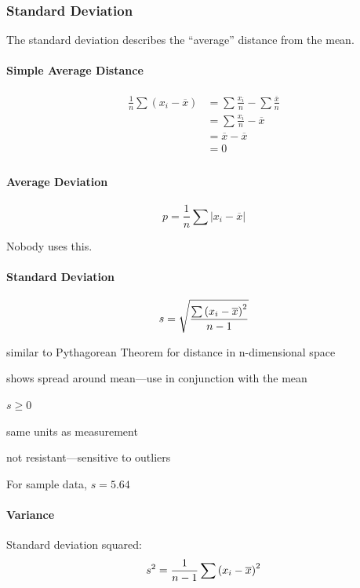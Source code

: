 \documentclass{exam}
\newcommand*\mean[1]{\overline{#1}}
\begin{document}
  \subsubsection{Standard Deviation}

  The standard deviation describes the ``average'' distance from the mean.

  \paragraph{Simple Average Distance}
  \begin{align*}
    \frac{1}{n} \sum (x_i - \mean{x}) & = \sum \frac{x_i}{n} - \sum \frac{ \mean{x} }{n} \\
                                      & = \sum \frac{x_i}{n} - \mean{x} \\
                                      & = \mean{x} - \mean{x} \\
                                      & = 0 \\
  \end{align*}

  \paragraph{Average Deviation}
  \[
    p = \frac{1}{n} \sum |x_i - \mean{x}|
  \]

  Nobody uses this.

  \paragraph{Standard Deviation}
  \[
    s = \sqrt{ \frac{\sum \del{ x_i - \mean{x} }^2 }{ n - 1 } } 
  \]

  \begin{itemize*}
    \item similar to Pythagorean Theorem for distance in n-dimensional space
    \item shows spread around mean---use in conjunction with the mean
    \item $s \geq 0$
    \item same units as measurement
    \item not resistant---sensitive to outliers
  \end{itemize*}

  For sample data, $s = 5.64$

  \paragraph{Variance}
  Standard deviation squared:
  \[
    s^2 = \frac{1}{n - 1} \sum \del{ x_i - \mean{x} }^2
  \]
\end{document}
